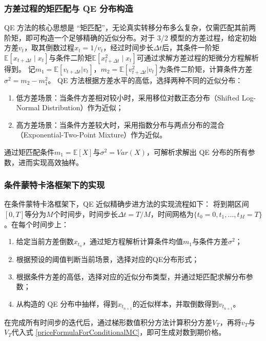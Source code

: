 \subsubsection{方差过程的矩匹配与 QE 分布构造}
QE 方法的核心思想是 “矩匹配”，无论真实转移分布多么复杂，仅需匹配其前两阶矩，即可构造一个足够精确的近似分布。对于 3/2 模型的方差过程，给定初始方差$v_t$​，取其倒数过程$x_t = 1/v_t$，经过时间步长$\Delta t$后，其条件一阶矩$\mathbb{E}[x_{t+Δt}∣x_t​]$与条件二阶矩$\mathbb{E}[x_{t+Δt}^2∣x_t​]$可通过求解方差过程的矩微分方程解析得到。
记$m_1=\mathbb{E}[v_{t+\Delta t}|v_t]$，$m_2=\mathbb{E}[v_{t+\Delta t}^2|v_t]$为条件二阶矩，计算条件方差$\sigma^2=m_2-m_1^2$。
QE 方法根据方差水平的高低，选择两种不同的近似分布：
\begin{enumerate}
  \item 低方差场景：当条件方差相对较小时，采用移位对数正态分布（Shifted Log-Normal Distribution）作为近似；
  \item 高方差场景：当条件方差较大时，采用指数分布与两点分布的混合（Exponential-Two-Point Mixture）作为近似。
\end{enumerate}
通过矩匹配条件$m_1 = \mathbb{E}[X]$与$\sigma^2=Var(X)$，可解析求解出 QE 分布的所有参数，进而实现高效抽样。

\subsubsection{条件蒙特卡洛框架下的实现}
在条件蒙特卡洛框架下，QE 近似精确步进方法的实现流程如下：
将到期区间$[0,T]$等分为$M$个时间步，时间步长$\Delta t=T/M$，时间网格为$\{t_0=0,t_1,\ldots,t_M=T\}$。在每个时间步上：
\begin{enumerate}
  \item 给定当前方差倒数$x_{t_n}$，通过矩方程解析计算条件均值$m_1$与条件方差$\sigma^2$；
  \item 根据预设的阈值判断当前场景，选择对应的QE分布形式；
  \item 根据条件方差的高低，选择对应的近似分布类型，并通过矩匹配求解分布参数；
  \item 从构造的 QE 分布中抽样，得到$x_{t_{n+1}}$的近似样本，并取倒数得到$v_{t_{n+1}}$。
\end{enumerate}
在完成所有时间步的迭代后，通过梯形数值积分方法计算积分方差$V_T$，再将$v_T$与$V_T$代入式 \eqref{priceFormulaForConditionalMC}，即可生成对数到期价格。

